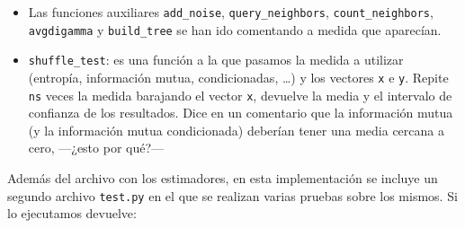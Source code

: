 \documentclass[10pt,a4paper]{article} %
\theoremstyle{definition}
\begin{document}
\begin{itemize}
\item Las funciones auxiliares \texttt{add\_noise}, \texttt{query\_neighbors}, \texttt{count\_neighbors}, \texttt{avgdigamma} y \texttt{build\_tree} se han ido comentando a medida que aparecían.

\item \texttt{shuffle\_test}: es una función a la que pasamos la medida a utilizar (entropía, información mutua, condicionadas, \dots) y los vectores \texttt{x} e \texttt{y}. Repite \texttt{ns} veces la medida barajando el vector \texttt{x}, devuelve la media y el intervalo de confianza de los resultados. Dice en un comentario que la información mutua (y la información mutua condicionada) deberían tener una media cercana a cero, ---¿esto por qué?---
\end{itemize}

Además del archivo con los estimadores, en esta implementación se incluye un segundo archivo \texttt{test.py} en el que se realizan varias pruebas sobre los mismos. Si lo ejecutamos devuelve:
\end{document}
